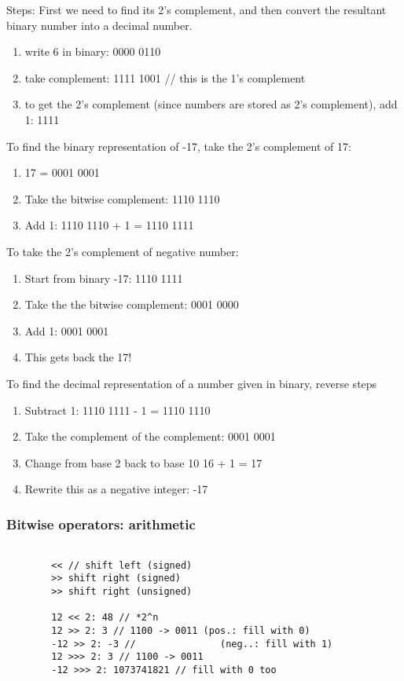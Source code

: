 \documentclass{scrartcl}
\begin{document}
    Steps: First we need to find its 2’s complement, and then convert the resultant binary number into a decimal number.

    \begin{enumerate}
        \item write 6 in binary: 0000 0110
        \item take complement: 1111 1001 // this is the 1's complement
        \item to get the 2's complement (since numbers are stored as 2’s complement), add 1: 1111
    \end{enumerate}

    To find the binary representation of -17, take the 2's complement of 17:
    \begin{enumerate}
        \item 17 = 0001 0001
        \item Take the bitwise complement: 1110 1110
        \item Add 1: 1110 1110 + 1 = 1110 1111
    \end{enumerate}

    To take the 2's complement of negative number:
    \begin{enumerate}
        \item Start from binary -17: 1110 1111
        \item     Take the the bitwise complement: 0001 0000
        \item     Add 1: 0001 0001
        \item     This gets back the 17!
    \end{enumerate}

    To find the decimal representation of a number given in binary, reverse steps
   \begin{enumerate}
       \item  Subtract 1: 1110 1111 - 1 = 1110 1110
       \item     Take the complement of the complement: 0001 0001
       \item     Change from base 2 back to base 10 16 + 1 = 17
       \item     Rewrite this as a negative integer: -17
   \end{enumerate}

\subsubsection{Bitwise operators: arithmetic}
    \begin{lstlisting}

        << // shift left (signed)
        >> shift right (signed)
        >> shift right (unsigned)

        12 << 2: 48 // *2^n
        12 >> 2: 3 // 1100 -> 0011 (pos.: fill with 0)
        -12 >> 2: -3 //               (neg..: fill with 1)
        12 >>> 2: 3 // 1100 -> 0011
        -12 >>> 2: 1073741821 // fill with 0 too
    \end{lstlisting}
\end{document}
